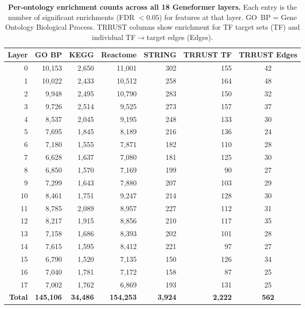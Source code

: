 \documentclass[11pt]{article}
\begin{document}
\begin{table}[H]
\centering
\caption{\textbf{Per-ontology enrichment counts across all 18 Geneformer layers.} Each entry is the number of significant enrichments (FDR $< 0.05$) for features at that layer. GO~BP = Gene Ontology Biological Process. TRRUST columns show enrichment for TF target sets (TF) and individual TF$\to$target edges (Edges).}
\label{tab:perontology}
\smallskip
\begin{tabular}{rrrrrrc}
\toprule
Layer & GO BP & KEGG & Reactome & STRING & TRRUST TF & TRRUST Edges \\
\midrule
0  & 10,153 & 2,650 & 11,001 & 302 & 155 & 42 \\
1  & 10,022 & 2,433 & 10,512 & 258 & 164 & 48 \\
2  & 9,948  & 2,495 & 10,790 & 283 & 150 & 32 \\
3  & 9,726  & 2,514 & 9,525  & 273 & 157 & 37 \\
4  & 8,537  & 2,045 & 9,195  & 248 & 133 & 30 \\
5  & 7,695  & 1,845 & 8,189  & 216 & 136 & 24 \\
6  & 7,180  & 1,555 & 7,871  & 182 & 110 & 28 \\
7  & 6,628  & 1,637 & 7,080  & 181 & 125 & 30 \\
8  & 6,850  & 1,570 & 7,169  & 199 & 90  & 27 \\
9  & 7,299  & 1,643 & 7,880  & 207 & 103 & 29 \\
10 & 8,461  & 1,751 & 9,247  & 214 & 128 & 30 \\
11 & 8,785  & 2,089 & 8,957  & 227 & 112 & 31 \\
12 & 8,217  & 1,915 & 8,856  & 210 & 117 & 35 \\
13 & 7,158  & 1,686 & 8,393  & 202 & 101 & 28 \\
14 & 7,615  & 1,595 & 8,412  & 221 & 97  & 27 \\
15 & 6,790  & 1,520 & 7,135  & 150 & 126 & 34 \\
16 & 7,040  & 1,781 & 7,172  & 158 & 87  & 25 \\
17 & 7,002  & 1,762 & 6,869  & 193 & 131 & 25 \\
\midrule
\textbf{Total} & \textbf{145,106} & \textbf{34,486} & \textbf{154,253} & \textbf{3,924} & \textbf{2,222} & \textbf{562} \\
\bottomrule
\end{tabular}
\end{table}
\end{document}
